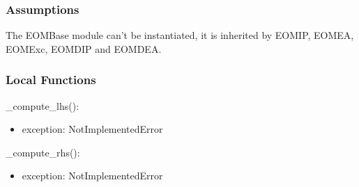 \documentclass[12pt, titlepage]{article}
\begin{document}
%
%
\subsubsection{Assumptions}

The EOMBase module can't be instantiated, it is inherited by EOMIP, EOMEA, 
EOMExc, EOMDIP and EOMDEA.
%
%
%
\subsubsection{Local Functions}

\noindent \_compute\_lhs():
\begin{itemize}
	\item exception: NotImplementedError 
\end{itemize}

\noindent\_compute\_rhs():
\begin{itemize}
	\item exception: NotImplementedError 
\end{itemize}
\end{document}
